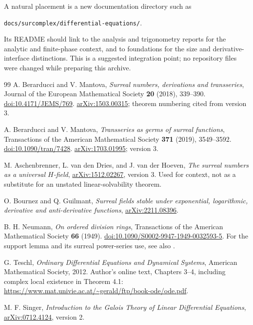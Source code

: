 \documentclass[11pt,letterpaper]{article}
\numberwithin{equation}{section}
\theoremstyle{definition}
\theoremstyle{remark}
\begin{document}
A natural placement is a new documentation directory such as
\begin{center}
\texttt{docs/surcomplex/differential-equations/}.
\end{center}
Its README should link to the analysis and trigonometry reports for the analytic and finite-phase context, and to foundations for the size and derivative-interface distinctions. This is a suggested integration point; no repository files were changed while preparing this archive.

\begin{thebibliography}{99}
\small
{}
A. Berarducci and V. Mantova,
\emph{Surreal numbers, derivations and transseries},
Journal of the European Mathematical Society \textbf{20} (2018), 339--390.
\href{https://doi.org/10.4171/JEMS/769}{doi:10.4171/JEMS/769}.
\href{https://arxiv.org/abs/1503.00315}{arXiv:1503.00315}; theorem numbering cited from version 3.

A. Berarducci and V. Mantova,
\emph{Transseries as germs of surreal functions},
Transactions of the American Mathematical Society \textbf{371} (2019), 3549--3592.
\href{https://doi.org/10.1090/tran/7428}{doi:10.1090/tran/7428}.
\href{https://arxiv.org/abs/1703.01995}{arXiv:1703.01995}; version 3.

M. Aschenbrenner, L. van den Dries, and J. van der Hoeven,
\emph{The surreal numbers as a universal $H$-field},
\href{https://arxiv.org/abs/1512.02267}{arXiv:1512.02267}, version 3.
Used for context, not as a substitute for an unstated linear-solvability theorem.

O. Bournez and Q. Guilmant,
\emph{Surreal fields stable under exponential, logarithmic, derivative and anti-derivative functions},
\href{https://arxiv.org/abs/2211.08396}{arXiv:2211.08396}.

B. H. Neumann,
\emph{On ordered division rings},
Transactions of the American Mathematical Society \textbf{66} (1949).
\href{https://doi.org/10.1090/S0002-9947-1949-0032593-5}{doi:10.1090/S0002-9947-1949-0032593-5}.
For the support lemma and its surreal power-series use, see also \cite{BMComposition}.

G. Teschl,
\emph{Ordinary Differential Equations and Dynamical Systems},
American Mathematical Society, 2012.
Author's online text, Chapters 3--4, including complex local existence in Theorem 4.1:
\url{https://www.mat.univie.ac.at/~gerald/ftp/book-ode/ode.pdf}.

M. F. Singer,
\emph{Introduction to the Galois Theory of Linear Differential Equations},
\href{https://arxiv.org/abs/0712.4124}{arXiv:0712.4124}, version 2.


\end{thebibliography}
\end{document}
